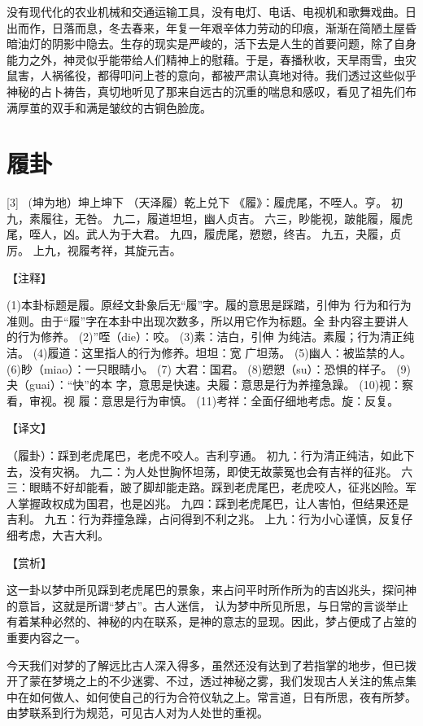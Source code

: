 \documentclass[12pt,UTF8]{ctexbook}
\begin{document}
没有现代化的农业机械和交通运输工具，没有电灯、电话、电视机和歌舞戏曲。日出而作，日落而息，冬去春来，年复一年艰辛体力劳动的印痕，渐渐在简陋土屋昏暗油灯的阴影中隐去。生存的现实是严峻的，活下去是人生的首要问题，除了自身能力之外，神灵似乎能带给人们精神上的慰藉。于是，春播秋收，天旱雨雪，虫灾鼠害，人祸徭役，都得叩问上苍的意向，都被严肃认真地对待。我们透过这些似乎神秘的占卜祷告，真切地听见了那来自远古的沉重的喘息和感叹，看见了祖先们布满厚茧的双手和满是皱纹的古铜色脸庞。

\chapter{履卦}
[3] \ (坤为地）坤上坤下
（天泽履）乾上兑下
《履》：履虎尾，不咥人。亨。
初九，素履往，无咎。
九二，履道坦坦，幽人贞吉。
六三，眇能视，跛能履，履虎尾，咥人，凶。武人为于大君。
九四，履虎尾，愬愬，终吉。
九五，夬履，贞厉。
上九，视履考祥，其旋元吉。

【注释】

(1)本卦标题是履。原经文卦象后无“履”字。履的意思是踩踏，引伸为 行为和行为准则。由于“履”字在本卦中出现次数多，所以用它作为标题。全 卦内容主要讲人的行为修养。
(2)”咥（die）：咬。
(3)素：洁白，引伸 为纯洁。素履；行为清正纯洁。
(4)履道：这里指人的行为修养。坦坦：宽 广坦荡。
(5)幽人：被监禁的人。
(6)眇（miao）：一只眼睛小。
(7) 大君：国君。
(8)愬愬（su）：恐惧的样子。
(9)夬（guai）：“快”的本 字，意思是快速。夬履：意思是行为养撞急躁。
(10)视：察看，审视。视 履：意思是行为审慎。
(11)考祥：全面仔细地考虑。旋：反复。

【译文】

（履卦）：踩到老虎尾巴，老虎不咬人。吉利亨通。
初九：行为清正纯洁，如此下去，没有灾祸。
九二：为人处世胸怀坦荡，即使无故蒙冤也会有吉祥的征兆。
六三：眼睛不好却能看，跛了脚却能走路。踩到老虎尾巴，老虎咬人，征兆凶险。军人掌握政权成为国君，也是凶兆。
九四：踩到老虎尾巴，让人害怕，但结果还是吉利。
九五：行为莽撞急躁，占问得到不利之兆。
上九：行为小心谨慎，反复仔细考虑，大吉大利。

【赏析】

这一卦以梦中所见踩到老虎尾巴的景象，来占问平时所作所为的吉凶兆头，探问神的意旨，这就是所谓“梦占”。古人迷信， 认为梦中所见所思，与日常的言谈举止有着某种必然的、神秘的内在联系，是神的意志的显现。因此，梦占便成了占筮的重要内容之一。

今天我们对梦的了解远比古人深入得多，虽然还没有达到了若指掌的地步，但已拨开了蒙在梦境之上的不少迷雾、不过，透过神秘之雾，我们发现古人关注的焦点集中在如何做人、如何使自己的行为合符仪轨之上。常言道，日有所思，夜有所梦。由梦联系到行为规范，可见古人对为人处世的重视。
\end{document}
